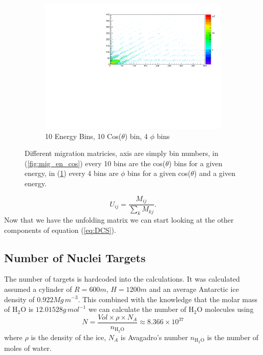 \documentclass[12pt]{article}
\numberwithin{equation}{section}
\numberwithin{figure}{section}
\begin{document}
\begin{figure}
\begin{subfigure}{0.4\textwidth}
                \includegraphics[scale=0.5,trim={5cm 0 0 0}]{Migration_E_Cos_Phi}
                \caption{10 Energy Bins, 10
                 Cos($\theta$) bin, 4 $\phi$ bins}
                \label{fig:mig_en_cos_phi}
    \end{subfigure}
	\caption{Different migration matricies, axis are simply bin numbers, in (\ref{fig:mig_en_cos}) every 10 bins are the cos($\theta$) bins for a given energy, in (\ref{fig:mig_en_cos_phi}) every 4 bins are $\phi$ bins for a given cos($\theta$) and a given energy.}
	\label{fig:migration_matricies}
\end{figure}
\begin{equation}
	U_{ij}=\frac{M_{ij}}{\sum\limits_k M_{kj}}.
\end{equation}
Now that we have the unfolding matrix we can start looking at the other components of equation (\ref{eq:DCS}).
%
%
\subsection{Number of Nuclei Targets}
The number of targets is hardcoded into the calculations. It was calculated assumed a cylinder of $R=600m$, $H=1200m$ and an average Antarctic ice density of $0.922Mg\,m^{-3}$.
This combined with the knowledge that the molar mass of $\text{H}_2\text{O}$ is $12.01528 g\,mol^{-1}$ we can calculate the number of $\text{H}_2\text{O}$ molecules using
\begin{equation}
	N = \frac{Vol \times \rho \times N_A}{n_{\text{H}_2\text{O}}} \approx 8.366\times 10^{37}
\end{equation}
where $\rho$ is the density of the ice, $N_A$ is Avagadro's number $n_{\text{H}_2\text{O}}$ is the number of moles of water.
\end{document}
